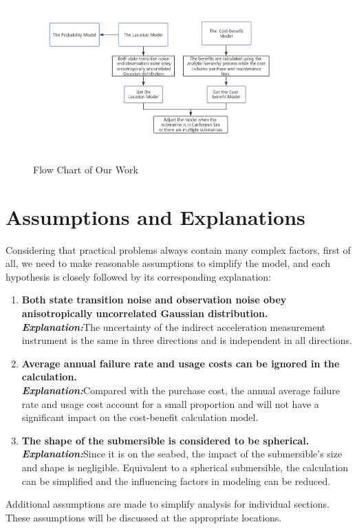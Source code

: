 \documentclass[12pt]{article}  %
\begin{document}
\begin{figure}[htbp]  %
\centering  %
\includegraphics[width=.9\textwidth]{ourwork.png} %
\caption{Flow Chart of Our Work} %
\end{figure}
\vspace{-0.8cm}

\section{Assumptions and Explanations}
Considering that practical problems always contain many complex factors, first of all, we need to make reasonable assumptions to simplify the model, and each hypothesis is closely followed by its corresponding explanation:

\begin{enumerate}
	\item \textbf{Both state transition noise and observation noise obey anisotropically uncorrelated Gaussian distribution.}\\
	\textbf{\textit{Explanation:}}The uncertainty of the indirect acceleration measurement instrument is the same in three directions and is independent in all directions.
	\item \textbf{Average annual failure rate and usage costs can be ignored in the calculation.}\\
	\textbf{\textit{Explanation:}}Compared with the purchase cost, the annual average failure rate and usage cost account for a small proportion and will not have a significant impact on the cost-benefit calculation model.
	\item \textbf{The shape of the submersible is considered to be spherical.}\\
	\textbf{\textit{Explanation:}}Since it is on the seabed, the impact of the submersible's size and shape is negligible. Equivalent to a spherical submersible, the calculation can be simplified and the influencing factors in modeling can be reduced.
	
\end{enumerate}
Additional assumptions are made to simplify analysis for individual sections. These assumptions will be discussed at the appropriate locations.
\end{document}
